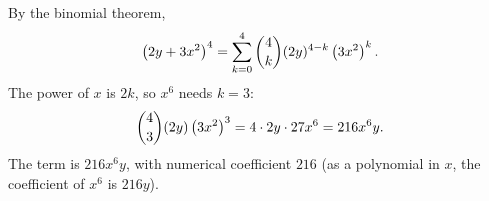 By the binomial theorem,
\[\left(2y+3x^2\right)^4=\sum_{k=0}^{4}\dbinom4k(2y)^{4-k}\left(3x^2\right)^k.\]
The power of $x$ is $2k$, so $x^6$ needs $k=3$:
\[\dbinom43(2y)\left(3x^2\right)^3=4\cdot2y\cdot27x^6=216x^6y.\]
The term is $\boxed{216x^6y}$, with numerical coefficient $216$ (as a polynomial in $x$, the coefficient of $x^6$ is $216y$).
